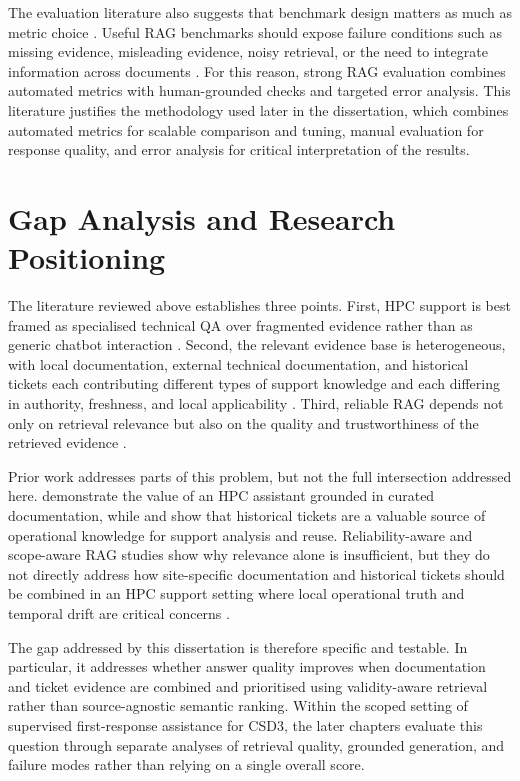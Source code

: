 The evaluation literature also suggests that benchmark design matters as much as metric choice \citep{BenchmarkingLargeLanguage}. Useful \ac{RAG} benchmarks should expose failure conditions such as missing evidence, misleading evidence, noisy retrieval, or the need to integrate information across documents \citep{BenchmarkingLargeLanguage}. For this reason, strong \ac{RAG} evaluation combines automated metrics with human-grounded checks and targeted error analysis. This literature justifies the methodology used later in the dissertation, which combines automated metrics for scalable comparison and tuning, manual evaluation for response quality, and error analysis for critical interpretation of the results. 

\section{Gap Analysis and Research Positioning}
\label{sec:gap}

The literature reviewed above establishes three points. First, \ac{HPC} support is best framed as specialised technical \ac{QA} over fragmented evidence rather than as generic chatbot interaction \citep{AskHPC,yuTechnicalQuestionAnswering2021}. Second, the relevant evidence base is heterogeneous, with local documentation, external technical documentation, and historical tickets each contributing different types of support knowledge and each differing in authority, freshness, and local applicability \citep{AskHPC,rodenbeckTicketHubEnablingActionable2023,joslinGeneratingFrequentlyAsked2025,liYouKnowWhat2024,hwangRetrievalAugmentedGenerationEstimation2025}. Third, reliable \ac{RAG} depends not only on retrieval relevance but also on the quality and trustworthiness of the retrieved evidence \citep{liYouKnowWhat2024,hwangRetrievalAugmentedGenerationEstimation2025,ouyangHoHDynamicBenchmark2025}.

Prior work addresses parts of this problem, but not the full intersection addressed here. \citet{AskHPC} demonstrate the value of an \ac{HPC} assistant grounded in curated documentation, while \citet{rodenbeckTicketHubEnablingActionable2023} and \citet{joslinGeneratingFrequentlyAsked2025} show that historical tickets are a valuable source of operational knowledge for support analysis and reuse. Reliability-aware and scope-aware \ac{RAG} studies show why relevance alone is insufficient, but they do not directly address how site-specific documentation and historical tickets should be combined in an \ac{HPC} support setting where local operational truth and temporal drift are critical concerns \citep{liYouKnowWhat2024,hwangRetrievalAugmentedGenerationEstimation2025,ouyangHoHDynamicBenchmark2025}.

The gap addressed by this dissertation is therefore specific and testable. In particular, it addresses whether answer quality improves when documentation and ticket evidence are combined and prioritised using validity-aware retrieval rather than source-agnostic semantic ranking. Within the scoped setting of supervised first-response assistance for \ac{CSD3}, the later chapters evaluate this question through separate analyses of retrieval quality, grounded generation, and failure modes rather than relying on a single overall score. 